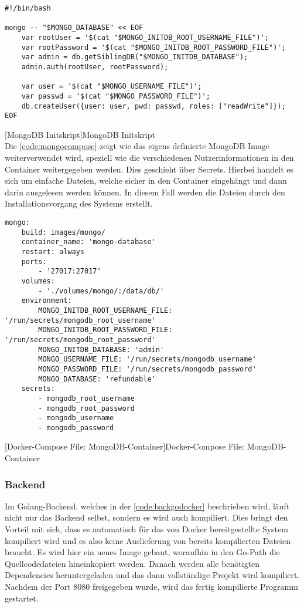 \newpage

\begin{verbatim}
#!/bin/bash

mongo -- "$MONGO_DATABASE" << EOF
	var rootUser = '$(cat "$MONGO_INITDB_ROOT_USERNAME_FILE")';
	var rootPassword = '$(cat "$MONGO_INITDB_ROOT_PASSWORD_FILE")';
	var admin = db.getSiblingDB("$MONGO_INITDB_DATABASE");
	admin.auth(rootUser, rootPassword);

	var user = '$(cat "$MONGO_USERNAME_FILE")';
	var passwd = '$(cat "$MONGO_PASSWORD_FILE")';
	db.createUser({user: user, pwd: passwd, roles: ["readWrite"]});
EOF
\end{verbatim}
[MongoDB Initskript]{MongoDB Initskript}
\label{code:mongoskript}
~\\
Die \autoref{code:mongocompose} zeigt wie das eigens definierte MongoDB Image weiterverwendet wird, speziell wie die verschiedenen Nutzerinformationen in den Container weitergegeben werden. Dies geschieht über Secrets. \cite{secretmongo} Hierbei handelt es sich um einfache Dateien, welche sicher in den Container eingehängt und dann darin ausgelesen werden können. In diesem Fall werden die Dateien durch den Installationsvorgang des Systems erstellt. 

\begin{verbatim}
mongo:
	build: images/mongo/
	container_name: 'mongo-database'
	restart: always
	ports:
		- '27017:27017'
	volumes:
		- './volumes/mongo/:/data/db/'
	environment:
		MONGO_INITDB_ROOT_USERNAME_FILE: '/run/secrets/mongodb_root_username'
		MONGO_INITDB_ROOT_PASSWORD_FILE: '/run/secrets/mongodb_root_password'
		MONGO_INITDB_DATABASE: 'admin'
		MONGO_USERNAME_FILE: '/run/secrets/mongodb_username'
		MONGO_PASSWORD_FILE: '/run/secrets/mongodb_password'
		MONGO_DATABASE: 'refundable'
	secrets:
		- mongodb_root_username
		- mongodb_root_password
		- mongodb_username
		- mongodb_password
\end{verbatim}
[Docker-Compose File: MongoDB-Container]{Docker-Compose File: MongoDB-Container}
\label{code:mongocompose}

\newpage

\subsubsection{Backend}

Im Golang-Backend, welches in der \autoref{code:backgodocker} beschrieben wird, läuft nicht nur das Backend selbst, sondern es wird auch kompiliert. Dies bringt den Vorteil mit sich, dass es automatisch für das von Docker bereitgestellte System kompiliert wird und es also keine Auslieferung von bereits kompilierten Dateien braucht. Es wird hier ein neues Image gebaut, woraufhin in den Go-Path die Quellcodedateien hineinkopiert werden. Danach werden alle benötigten Dependencies heruntergeladen und das dann vollständige Projekt wird kompiliert. Nachdem der Port 8080 freigegeben wurde, wird das fertig kompilierte Programm gestartet.

